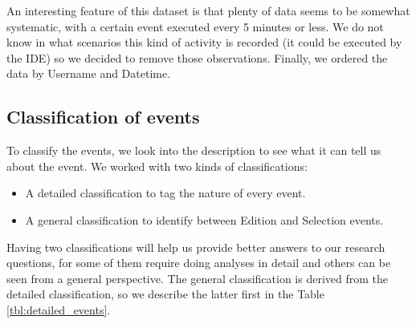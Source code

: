 An interesting feature of this dataset is that plenty of data seems to be somewhat systematic, with a certain event executed every 5 minutes or less. We do not know in what scenarios this kind of activity is recorded (it could be executed by the IDE) so we decided to remove those observations. Finally, we ordered the data by Username and Datetime.

\subsection{Classification of events}
To classify the events, we look into the description to see what it can tell us about the event. We worked with two kinds of classifications:
\begin{itemize}
	\item A detailed classification to tag the nature of every event.
	\item A general classification to identify between Edition and Selection events.
\end{itemize}
Having two classifications will help us provide better answers to our research questions, for some of them require doing analyses in detail and others can be seen from a general perspective. The general classification is derived from the detailed classification, so we describe the latter first in the Table \ref{tbl:detailed_events}.

